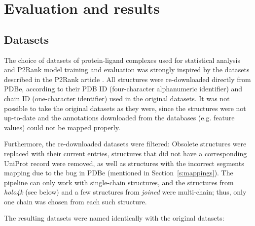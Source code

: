 \chapter{Evaluation and results} \label{ch:4}

\section{Datasets} \label{s:datasets}

The choice of datasets of protein-ligand complexes used for statistical analysis and P2Rank model training and evaluation was strongly inspired by the datasets described in the P2Rank article \cite{p2rank1}. All structures were re-downloaded directly from PDBe, according to their PDB ID (four-character alphanumeric identifier) and chain ID (one-character identifier) used in the original datasets. It was not possible to take the original datasets as they were, since the structures were not up-to-date and the annotations downloaded from the databases (e.g. feature values) could not be mapped properly.

Furthermore, the re-downloaded datasets were filtered: Obsolete structures were replaced with their current entries, structures that did not have a corresponding UniProt record were removed, as well as  structures with the incorrect segments mapping due to the bug in PDBe (mentioned in Section~\ref{s:mappings}). The pipeline can only work with single-chain structures, and the structures from \textit{holo4k} (see below) and a few structures from \textit{joined} were multi-chain; thus, only one chain was chosen from each such structure.

The resulting datasets were named identically with the original datasets:

